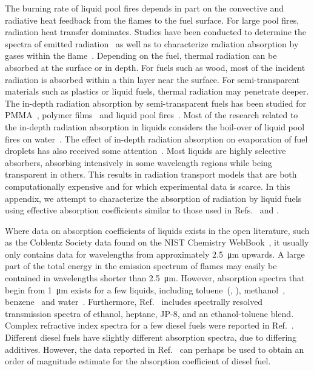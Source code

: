 The burning rate of liquid pool fires depends in part on the convective and radiative heat feedback from the flames to the fuel surface. For large pool fires, radiation heat transfer dominates. Studies have been conducted to determine the spectra of emitted radiation~\cite{Suo-Anttila:PCT2009} as well as to characterize radiation absorption by gases within the flame~\cite{Wakatsuki:CST2008}. Depending on the fuel, thermal radiation can be absorbed at the surface or in depth. For fuels such as wood, most of the incident radiation is absorbed within a thin layer near the surface. For semi-transparent materials such as plastics or liquid fuels, thermal radiation may penetrate deeper. The in-depth radiation absorption by semi-transparent fuels has been studied for PMMA~\cite{Stoliarov:CF2009}, polymer films~\cite{Tsilingiris:ECM2003} and liquid pool fires~\cite{Suo-Anttila:PCT2009}. Most of the research related to the in-depth radiation absorption in liquids considers the boil-over of liquid pool fires on water~\cite{Broeckmann:JLPPI1995}. The effect of in-depth radiation absorption on evaporation of fuel droplets has also received some attention~\cite{Sazhin:IJHMT2004b}. Most liquids are highly selective absorbers, absorbing intensively in some wavelength regions while being transparent in others. This results in radiation transport models that are both computationally expensive and for which experimental data is scarce. In this appendix, we attempt to characterize the absorption of radiation by liquid fuels using effective absorption coefficients similar to those used in Refs.~\cite{Madhav:IJMP1995} and \cite{Manohar:JHT1995}.

Where data on absorption coefficients of liquids exists in the open literature, such as the Coblentz Society data found on the NIST Chemistry WebBook~\cite{Coblentz:1}, it usually  only contains data for wavelengths from approximately \SI{2.5}{\micro m} upwards. A large part of the total energy in the emission spectrum of flames may easily be contained in wavelengths shorter than \SI{2.5}{\micro m}. However, absorption spectra that begin from \SI{1}{\micro m} exists for a few liquids, including toluene~(\cite{Bertie:JMS2005}, \cite{Bertie:AS1994a}), methanol~\cite{Bertie:AS1993a}, benzene~\cite{Bertie:AS1993b} and water~\cite{Bertie:AS1996}. Furthermore, Ref.~\cite{Suo-Anttila:PCT2009} includes spectrally resolved transmission spectra of ethanol, heptane, JP-8, and an ethanol-toluene blend. Complex refractive index spectra for a few diesel fuels were reported in Ref.~\cite{Sazhin:IJHMT2004b}. Different diesel fuels have slightly different absorption spectra, due to differing additives. However, the data reported in Ref.~\cite{Sazhin:IJHMT2004b} can perhaps be used to obtain an order of magnitude estimate for the absorption coefficient of diesel fuel.

